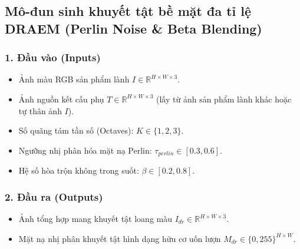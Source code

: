 \subsection{Mô-đun sinh khuyết tật bề mặt đa tỉ lệ DRAEM (Perlin Noise \& Beta Blending)}

\subsubsection*{1. Đầu vào (Inputs)}
\begin{itemize}
    \item Ảnh màu RGB sản phẩm lành $I \in \mathbb{R}^{H \times W \times 3}$.
    \item Ảnh nguồn kết cấu phụ $T \in \mathbb{R}^{H \times W \times 3}$ (lấy từ ảnh sản phẩm lành khác hoặc tự thân ảnh $I$).
    \item Số quãng tám tần số (Octaves): $K \in \{1, 2, 3\}$.
    \item Ngưỡng nhị phân hóa mặt nạ Perlin: $\tau_{perlin} \in [0.3, 0.6]$.
    \item Hệ số hòa trộn không trong suốt: $\beta \in [0.2, 0.8]$.
\end{itemize}

\subsubsection*{2. Đầu ra (Outputs)}
\begin{itemize}
    \item Ảnh tổng hợp mang khuyết tật loang màu $I_{dr} \in \mathbb{R}^{H \times W \times 3}$.
    \item Mặt nạ nhị phân khuyết tật hình dạng hữu cơ uốn lượn $M_{dr} \in \{0, 255\}^{H \times W}$.
\end{itemize}

